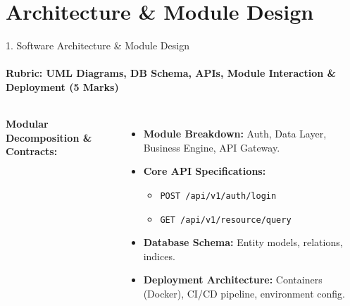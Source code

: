 \documentclass[aspectratio=169, 11pt]{beamer}
\begin{document}
\section{Architecture \& Module Design}
\begin{frame}{1. Software Architecture \& Module Design}
    \framesubtitle{Rubric: UML Diagrams, DB Schema, APIs, Module Interaction \& Deployment (5 Marks)}
    \begin{columns}
        \textbf{Modular Decomposition \& Contracts:}
        \begin{itemize}
            \item \textbf{Module Breakdown:} Auth, Data Layer, Business Engine, API Gateway.
            \item \textbf{Core API Specifications:}
            \begin{itemize}
                \item \texttt{POST /api/v1/auth/login}
                \item \texttt{GET  /api/v1/resource/query}
            \end{itemize}
            \item \textbf{Database Schema:} Entity models, relations, indices.
            \item \textbf{Deployment Architecture:} Containers (Docker), CI/CD pipeline, environment config.
        \end{itemize}

        \centering
    \end{columns}
\end{frame}

\end{document}
